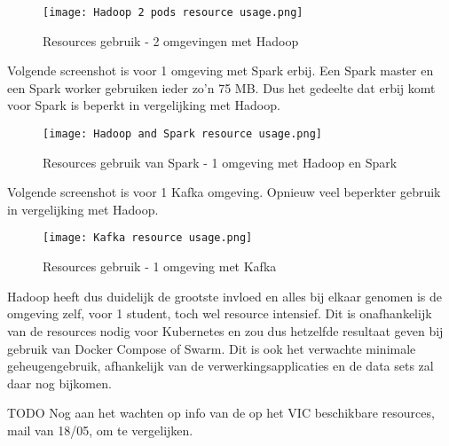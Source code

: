 \begin{figure}[H]
    \texttt{[image: Hadoop 2 pods resource usage.png]}
    \caption{Resources gebruik - 2 omgevingen met Hadoop}
\end{figure}

Volgende screenshot is voor 1 omgeving met Spark erbij. Een Spark master en een Spark worker gebruiken ieder zo'n 75 MB. Dus het gedeelte dat erbij komt voor Spark is beperkt in vergelijking met Hadoop.
\begin{figure}[H]
    \texttt{[image: Hadoop and Spark resource usage.png]}
    \caption{Resources gebruik van Spark - 1 omgeving met Hadoop en Spark}
\end{figure}

Volgende screenshot is voor 1 Kafka omgeving. Opnieuw veel beperkter gebruik in vergelijking met Hadoop.
\begin{figure}[H]
    \texttt{[image: Kafka resource usage.png]}
    \caption{Resources gebruik - 1 omgeving met Kafka}
\end{figure}

Hadoop heeft dus duidelijk de grootste invloed en alles bij elkaar genomen is de omgeving zelf, voor 1 student, toch wel resource intensief. Dit is onafhankelijk van de resources nodig voor Kubernetes en zou dus hetzelfde resultaat geven bij gebruik van Docker Compose of Swarm.
\newline
Dit is ook het verwachte minimale geheugengebruik, afhankelijk van de verwerkingsapplicaties en de data sets zal daar nog bijkomen.
\newline

TODO Nog aan het wachten op info van de op het VIC beschikbare resources, mail van 18/05, om te vergelijken.


